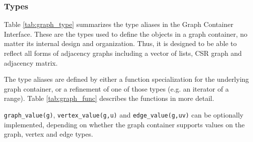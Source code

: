 \documentclass[10pt,onecolumn]{article}
\newcommand{\tcode}[1]{\lstinline[breaklines=true]{#1}}
\begin{document}
\subsubsection{Types}
Table \ref{tab:graph_type} summarizes the type aliases in the Graph Container Interface. These are the types used to define the objects in a graph container, no matter its internal design and organization. Thus, it is designed to be able to reflect all forms of adjacency graphs including a vector of lists, CSR graph and adjacency matrix.

The type aliases are defined by either a function specialization for the underlying graph container, or a refinement of one of those types (e.g. an iterator of a range). Table \ref{tab:graph_func} describes the functions in more detail.

\tcode{graph_value(g)}, \tcode{vertex_value(g,u)} and \tcode{edge_value(g,uv)} can be optionally implemented, depending on whether the graph container supports values on the graph, vertex and edge types.
\end{document}
